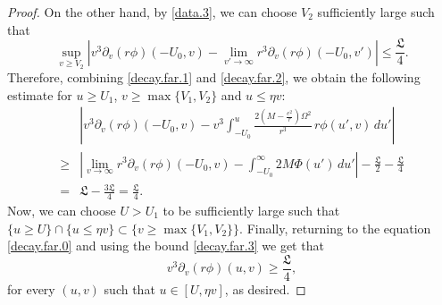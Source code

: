 \documentclass[12 pt, reqno]{amsart}
\theoremstyle{definition}
\theoremstyle{remark}
\numberwithin{equation}{section}
\newcommand{\rd}{\partial}
\newcommand{\0}{\emptyset}
\newcommand{\Omg}{\Omega}
\newcommand{\f}{\frac}
\begin{document}
\begin{proof}
On the other hand, by \eqref{data.3}, we can choose $V_2$ sufficiently large such that
\begin{equation}\label{decay.far.2}
\sup_{v\geq V_2}|v^3\rd_v(r\phi)({-U_0},v)-\lim_{v'\to \infty}r^3\rd_v(r\phi)({-U_0},v')|\leq \f{\mathfrak L}4.
\end{equation}
Therefore, combining \eqref{decay.far.1} and \eqref{decay.far.2}, we obtain the following estimate for $u\geq U_1$, $v\geq \max\{V_1,V_2\}$ and $u\leq \eta v$:
\begin{equation}\label{decay.far.3}
\begin{split}
&|v^3\rd_v(r\phi)({-U_0},v)-v^3\int_{-U_0}^u \f{2(M-\f{e^2}{r})\Omg^2}{r^3} \, r \phi (u',v)\,du'|\\
\geq &|\lim_{v\to \infty}r^3\rd_v(r\phi)({-U_0},v)-\int_{-U_0}^\infty 2M \Phi(u')  \,du'|-\f{\mathfrak L}{2}-\f{\mathfrak L}{4}\\
= &\mathfrak L-\f{3 \mathfrak L}{4}= \f{\mathfrak L}{4}.
\end{split}
\end{equation}
Now, we can choose $U>U_1$ to be sufficiently large such that $\{u\geq U\}\cap\{u\leq \eta v\}\subset\{v\geq \max\{V_1,V_2\}\}$. Finally, returning to the equation \eqref{decay.far.0} and using the bound \eqref{decay.far.3} we get that
$$v^3 \rd_v(r\phi)(u,v)\geq \f{\mathfrak L}{4},$$
for every $(u,v)$ such that $u\in [U,\eta v]$, as desired.
\end{proof}
\end{document}
